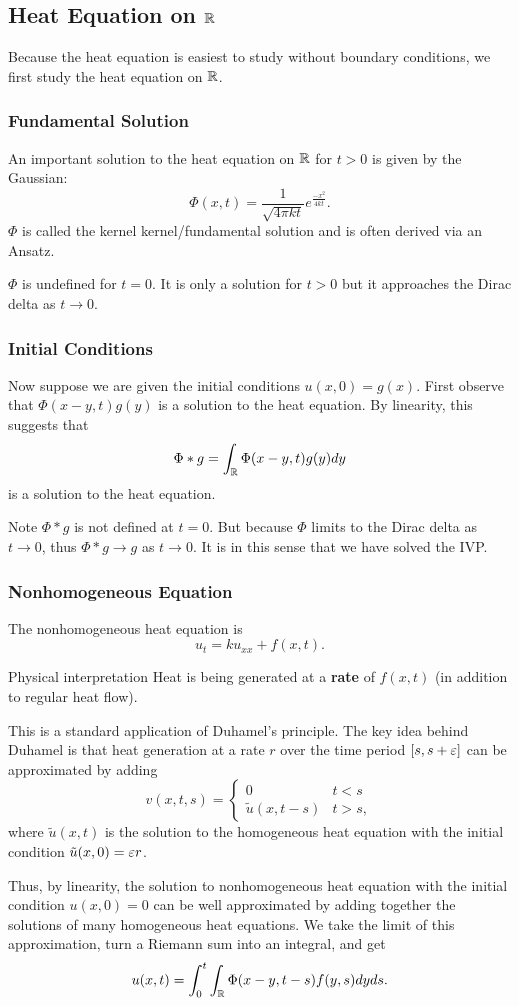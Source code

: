 \subsection{Heat Equation on ${\mathbb R}$}
Because the heat equation is easiest to study without boundary conditions, we first study the heat equation on ${\mathbb R}$.
\subsubsection{Fundamental Solution}
An important solution to the heat equation on ${\mathbb R}$ for $t > 0$ is given by the Gaussian:
\[
    \Phi(x,t) = \frac{1}{\sqrt{4\pi kt}}e^{ \frac{-x^2}{4kt}}.
\]
$\Phi$ is called the kernel kernel/fundamental solution and is often derived via an Ansatz.
\begin{remark}
    $\Phi$ is undefined for $t = 0$. It is only a solution for $t > 0$ but it approaches the Dirac delta as $t \rightarrow 0$.
\end{remark}
\subsubsection{Initial Conditions}
Now suppose we are given the initial conditions $u(x,0) = g(x)$. First observe that $\Phi(x-y,t)g(y)$ is a solution to the heat equation. By linearity, this suggests that
\[
    \Phi * g = \int_{\mathbb R} \Phi(x-y,t)g(y) dy
\]
is a solution to the heat equation.

Note $\Phi * g$ is not defined at $t = 0$. But because $\Phi$ limits to the Dirac delta as $t \rightarrow 0$, thus $\Phi * g \rightarrow g$ as $t \rightarrow 0$. It is in this sense that we have solved the IVP.

\subsubsection{Nonhomogeneous Equation}
The nonhomogeneous heat equation is
\[
    u_t = ku_{xx} + f(x,t).
\]
\begin{details}{Physical interpretation}
    Heat is being generated at a \textbf{rate} of $f(x,t)$ (in addition to regular heat flow).
\end{details}
This is a standard application of Duhamel's principle. The key idea behind Duhamel is that heat generation at a rate $r$ over the time period $[s,s+\varepsilon]$ can be approximated by adding
\[
    v(x,t,s) =
    \begin{cases}
        0   &   t < s\\
        \tilde{u}(x,t-s) & t > s,
    \end{cases}
\]
where $\tilde{u}(x,t)$ is the solution to the homogeneous heat equation with the initial condition $\tilde{u}(x,0) = \varepsilon r$. 

Thus, by linearity, the solution to nonhomogeneous heat equation with the initial condition $u(x,0) = 0$ can be well approximated by adding together the solutions of many homogeneous heat equations. We take the limit of this approximation, turn a Riemann sum into an integral, and get
\[
    u(x,t) = \int_0^t \int_{\mathbb R} \Phi(x - y, t-s)f(y,s)dyds.
\]
